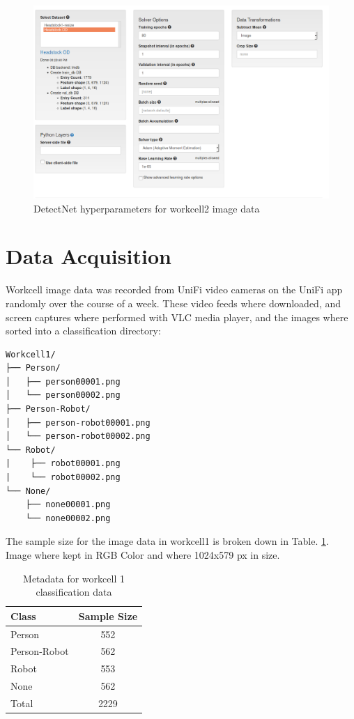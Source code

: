 \documentclass[10pt,journal,compsoc]{IEEEtran}
\begin{document}
\begin{figure}[thpb]
  \centering
  \includegraphics[width=\linewidth]{../img/Workcell2-Object-Detection/model/Workcell2-detectNet-Model01.png}
  \caption{DetectNet hyperparameters for workcell2 image data}
  \label{workcell2Model}
\end{figure}


\section{Data Acquisition}
\label{sec:dataAc}

Workcell image data was recorded from UniFi video cameras on the UniFi app randomly over the course of a week. These video feeds where downloaded, and screen captures where performed with VLC media player, and the images where sorted into a classification directory:

\begin{verbatim}
Workcell1/
├── Person/
│   ├── person00001.png
│   └── person00002.png
├── Person-Robot/
│   ├── person-robot00001.png
│   └── person-robot00002.png
└── Robot/
|    ├── robot00001.png
|    └── robot00002.png
└── None/
    ├── none00001.png
    └── none00002.png
\end{verbatim}

The sample size for the image data in workcell1 is broken down in Table. \ref{tab:WC1Data}. Image where kept in RGB Color and where 1024x579 px in size.
\begin{table}[h]
    \caption{Metadata for workcell 1 classification data}
    \begin{center}
    \begin{tabular}{lc}
    \toprule%
    Class & Sample Size\\\hline\noalign{\smallskip}
    Person & 552\\
    Person-Robot & 562\\
    Robot & 553\\
    None & 562\\\hline\noalign{\smallskip}
    Total & 2229\\
    \bottomrule%
    \end{tabular}
    \end{center}
    \label{tab:WC1Data}
\end{table}
\end{document}
